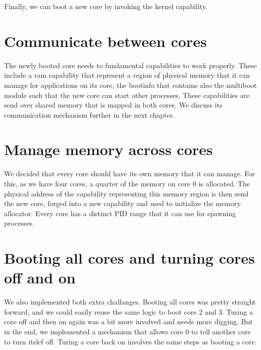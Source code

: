 Finally, we can boot a new core by invoking the kernel capability.

\section{Communicate between cores}

The newly booted core needs to fundamental capabilities to work properly. These
include a ram capability that represent a region of physical memory that it can
manage for applications on its core, the bootinfo that contains also the
multiboot module such that the new core can start other processes.  These
capabilities are send over shared memory that is mapped in both cores. We
discuss its communication mechanism further in the next chapter.

\section{Manage memory across cores}

We decided that every core should have its own memory that it can manage. For
this, as we have four cores, a quarter of the memory on core 0 is allocated. The
physical address of the capability representing this memory region is then send
the new core, forged into a new capability and used to initialize the memory
allocator.  Every core has a distinct PID range that it can use for spawning
processes.

\section{Booting all cores and turning cores off and on}

We also implemented both extra challanges. Booting all cores was pretty straight
forward, and we could easily reuse the same logic to boot core 2 and 3.  Turing
a core off and then on again was a bit more involved and neede more digging. But
in the end, we implemented a mechanism that allows core 0 to tell another core
to turn itslef off. Turing a core back on involves the same steps as booting a
core.



